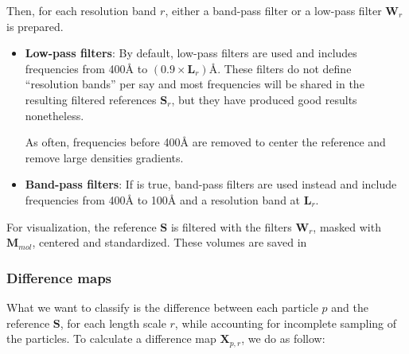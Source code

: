 
Then, for each resolution band $r$,  either a band-pass filter or a low-pass filter $\bm{W}_r$ is prepared.
\begin{itemize}
    \item \textbf{Low-pass filters}: By default, low-pass filters are used and includes frequencies from 400\si{\angstrom} to $(0.9 \times \bm{L}_{r})$\si{\angstrom}. These filters do not define ``resolution bands'' per say and most frequencies will be shared in the resulting filtered references $\bm{S}_r$, but they have produced good results nonetheless.
    \begin{note}As often, frequencies before 400\si{\angstrom} are removed to center the reference and remove large densities gradients.\end{note}
    
    \item \textbf{Band-pass filters}: If  is true, band-pass filters are used instead and include frequencies from 400\si{\angstrom} to 100\si{\angstrom} and a resolution band at $\bm{L}_r$.
\end{itemize}

For visualization, the reference $\bm{S}$ is filtered with the filters $\bm{W}_r$, masked with $\bm{M}_{mol}$, centered and standardized. These volumes are saved in 



\subsubsection{Difference maps}

What we want to classify is the difference between each particle $p$ and the reference $\bm{S}$, for each length scale $r$, while accounting for incomplete sampling of the particles. To calculate a difference map $\bm{X}_{p,r}$, we do as follow:

